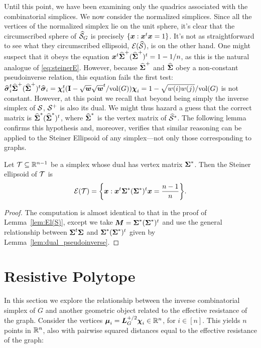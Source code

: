Until this point, we have been examining only the quadrics associated with the combinatorial simplices. We now consider the normalized simplices. Since all the vertices of the normalized simplex lie on the unit sphere, it's clear  that the circumscribed sphere of $\widehat{\mathcal{S}}_G$ is precisely $\{\vb*{x}:\vb*{x}^t\vb*{x}=1\}$. It's not as straightforward  to see what they circumscribed ellipsoid, $\mathcal{E}(\widehat{\mathcal{S}})$, is on the other hand. One might suspect that it obeys the  equation $\vb*{x}^t \widehat{\boldsymbol{\Sigma}}^+(\widehat{\boldsymbol{\Sigma}}^+)^t=1-1/n$, as this is the natural analogue of \eqref{eq:steinerE}. However, because $\widehat{\boldsymbol{\Sigma}}^+$ and $\widehat{\boldsymbol{\Sigma}}$ obey a non-constant pseudoinverse relation, this equation fails the first test: $\widehat{\vb*{\sigma}}_i^t\widehat{\boldsymbol{\Sigma}}^+(\widehat{\boldsymbol{\Sigma}}^+)^t\widehat{\vb*{\sigma}}_i = \boldsymbol{\chi}_i^t(\vb{I}-\sqrt{\vb*{w}}\sqrt{\vb*{w}}^t/\textnormal{vol}(G))\boldsymbol{\chi}_i=1-\sqrt{w(i)w(j)}/\textnormal{vol}(G)$ is not constant. 
However, at this point we recall that beyond being simply  the inverse simplex of $\mathcal{S}$, $\mathcal{S}^+$ is also its dual.  We might thus hazard a guess that the correct matrix is $\widehat{\boldsymbol{\Sigma}}^* (\widehat{\boldsymbol{\Sigma}}^*)^t$, where $\widehat{\boldsymbol{\Sigma}}^*$ is the vertex matrix of $\widehat{\mathcal{S}}^*$. The  following lemma  confirms this hypothesis and, moreover, verifies that similar reasoning can be applied to the Steiner Ellipsoid of any simplex---not only those corresponding to graphs.  

\begin{lemma}
	\label{lem:El(T)_general}
	Let $\mathcal{T}\subseteq\mathbb{R}^{n-1}$ be a simplex whose dual has vertex matrix  $\boldsymbol{\Sigma}^*$. Then  the Steiner ellipsoid of $\mathcal{T}$ is 
	\begin{equation*}
	\mathcal{E}(\mathcal{T}) = \bigg\{\vb*{x}:\vb*{x}^t\boldsymbol{\Sigma}^*(\boldsymbol{\Sigma}^*)^t\vb*{x}=\frac{n-1}{n}\bigg\}.
	\end{equation*} 
\end{lemma}

\begin{proof}
	The computation is almost identical to that in the proof of Lemma~\ref{lem:El(S)}, except we  take ${\vb*{M}}=\boldsymbol{\Sigma}^*(\boldsymbol{\Sigma}^*)^t$ and use the general relationship between  $\boldsymbol{\Sigma}^t\boldsymbol{\Sigma}$ and $\boldsymbol{\Sigma}^*(\boldsymbol{\Sigma}^*)^t$ given by Lemma~\ref{lem:dual_pseudoinverse}. 
\end{proof}


\section{Resistive Polytope}
\label{sec:resistive_polytope}
In this section we explore the relationship between the inverse combinatorial simplex of $G$ and another geometric object related to the effective resistance of the graph. Consider the vertices $\vb*{\mu}_i=\vb*{L}_G^{+/2}\boldsymbol{\chi}_i\in\mathbb{R}^n$, for $i\in[n]$. This yields $n$ points in $\mathbb{R}^n$, also with pairwise squared distances equal to the effective resistance of the graph: 


